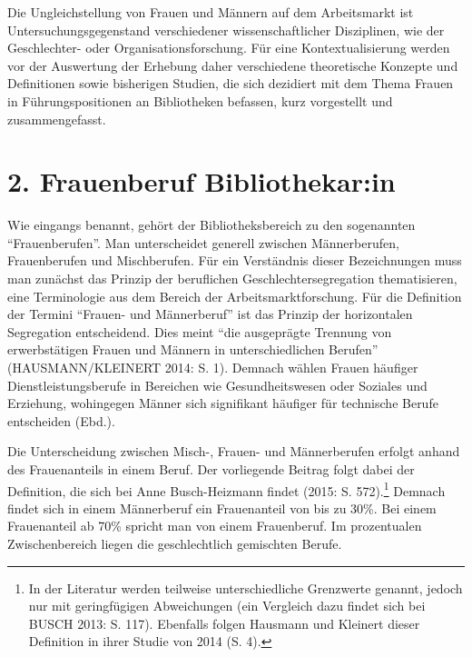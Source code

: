 \documentclass[a4paper,
fontsize=11pt,
oneside,
numbers=noperiodatend,
parskip=half-,
bibliography=totoc,
final
]{scrartcl}
\begin{document}
Die Ungleichstellung von Frauen und Männern auf dem Arbeitsmarkt ist
Untersuchungsgegenstand verschiedener wissenschaftlicher Disziplinen,
wie der Geschlechter- oder Organisationsforschung. Für eine
Kontextualisierung werden vor der Auswertung der Erhebung daher
verschiedene theoretische Konzepte und Definitionen sowie bisherigen
Studien, die sich dezidiert mit dem Thema Frauen in Führungspositionen
an Bibliotheken befassen, kurz vorgestellt und zusammengefasst.

\hypertarget{frauenberuf-bibliothekarin}{%
\section{2. Frauenberuf
Bibliothekar:in}\label{frauenberuf-bibliothekarin}}

Wie eingangs benannt, gehört der Bibliotheksbereich zu den sogenannten
\enquote{Frauenberufen}. Man unterscheidet generell zwischen
Männerberufen, Frauenberufen und Mischberufen. Für ein Verständnis
dieser Bezeichnungen muss man zunächst das Prinzip der beruflichen
Geschlechtersegregation thematisieren, eine Terminologie aus dem Bereich
der Arbeitsmarktforschung. Für die Definition der Termini
\enquote{Frauen- und Männerberuf} ist das Prinzip der horizontalen
Segregation entscheidend. Dies meint \enquote{die ausgeprägte Trennung
von erwerbstätigen Frauen und Männern in unterschiedlichen Berufen}
(HAUSMANN/KLEINERT 2014: S. 1). Demnach wählen Frauen häufiger
Dienstleistungsberufe in Bereichen wie Gesundheitswesen oder Soziales
und Erziehung, wohingegen Männer sich signifikant häufiger für
technische Berufe entscheiden (Ebd.).

Die Unterscheidung zwischen Misch-, Frauen- und Männerberufen erfolgt
anhand des Frauenanteils in einem Beruf. Der vorliegende Beitrag folgt
dabei der Definition, die sich bei Anne Busch-Heizmann findet (2015: S.
572).\footnote{In der Literatur werden teilweise unterschiedliche
  Grenzwerte genannt, jedoch nur mit geringfügigen Abweichungen (ein
  Vergleich dazu findet sich bei BUSCH 2013: S. 117). Ebenfalls folgen
  Hausmann und Kleinert dieser Definition in ihrer Studie von 2014 (S.
  4).} Demnach findet sich in einem Männerberuf ein Frauenanteil von bis
zu 30\%. Bei einem Frauenanteil ab 70\% spricht man von einem
Frauenberuf. Im prozentualen Zwischenbereich liegen die geschlechtlich
gemischten Berufe.
\end{document}

